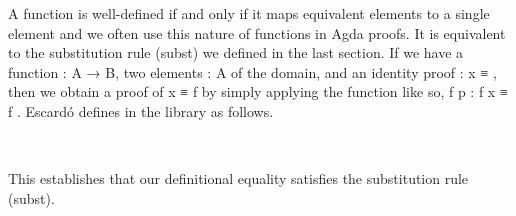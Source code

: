A function is well-defined if and only if it maps equivalent elements to a single element and we often use this nature of functions in Agda proofs.  It is equivalent to the substitution rule (subst) we defined in the last section. If we have a function  \as : \ab A \as → \ab B, two elements   \as : \ab A of the domain, and an identity proof  \as : \ab x \ad ≡ , then we obtain a proof of  \ab x \ad ≡ \ab f  by simply applying the  function like so,  \ab f \ab p \as : \ab f \ab x \ad ≡ \ab f . Escardó defines  in the \typetopology library as follows.
\ccpad
\begin{code}%
\>[1]\AgdaSpace{}%
\AgdaSymbol{:}\AgdaSpace{}%
\AgdaSymbol{\{}\AgdaSpace{}%
\AgdaSymbol{:}\AgdaSpace{}%
\AgdaSpace{}%
\AgdaSymbol{\}\{}\AgdaSpace{}%
\AgdaSymbol{:}\AgdaSpace{}%
\AgdaSpace{}%
\AgdaSymbol{\}}
\AgdaSymbol{(}\AgdaSpace{}%
\AgdaSymbol{:}\AgdaSpace{}%
\AgdaSpace{}%
\AgdaSpace{}%
\AgdaSymbol{)\{}\AgdaSpace{}%
\AgdaSpace{}%
\AgdaSymbol{:}\AgdaSpace{}%
\AgdaSymbol{\}}\AgdaSpace{}%
\AgdaSpace{}%
\AgdaSpace{}%
\AgdaSpace{}%
\AgdaSpace{}%
\AgdaSpace{}%
\AgdaSpace{}%
\AgdaSpace{}%
\AgdaSpace{}%
\AgdaSpace{}%
\<%
\\
%
\>[1]\AgdaSpace{}%
\AgdaSpace{}%
\AgdaSymbol{\{}\AgdaSymbol{\}}\AgdaSpace{}%
\AgdaSpace{}%
\AgdaSymbol{=}\AgdaSpace{}%
\AgdaSpace{}%
\AgdaSpace{}%
\AgdaBound{-}\AgdaSpace{}%
\AgdaSpace{}%
\AgdaSpace{}%
\AgdaSpace{}%
\AgdaSpace{}%
\AgdaSpace{}%
\AgdaBound{-}\AgdaSymbol{)}\AgdaSpace{}%
\AgdaSpace{}%
\AgdaSymbol{(}\AgdaSpace{}%
\AgdaSymbol{\{}\AgdaSpace{}%
\AgdaSymbol{=}\AgdaSpace{}%
\AgdaSpace{}%
\AgdaSymbol{\})}\<%
\end{code}
\ccpad
This establishes that our definitional equality satisfies the substitution rule (subst).

